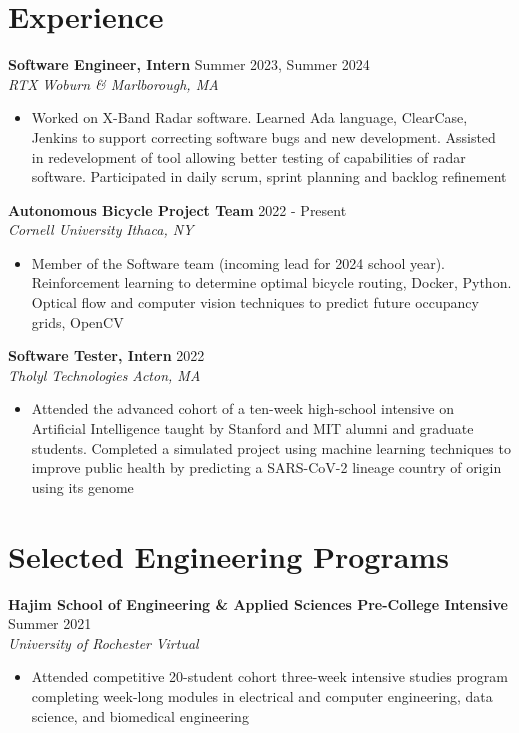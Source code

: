 \documentclass[letterpaper,8pt]{article}
\newcommand{\resumeEntry}[4]{
    \vspace{4pt}
    \large \textbf{#1}
    \normalsize \hfill #2
    \\
    \textit{#3} \hfill \textit{#4}
    \vspace{1pt}
}
\newcommand{\itemsBegin}{
    \begin{itemize}[leftmargin=0.2in, labelsep=0.05in, itemsep=0pt, parsep=1pt, topsep=0pt, partopsep=0pt]
}
\newcommand{\itemsEnd}{\end{itemize}}
\begin{document}
\section{Experience}

    \resumeEntry
        {Software Engineer, Intern}
        {Summer 2023, Summer 2024}
        {RTX}
        {Woburn \& Marlborough, MA}

    \itemsBegin
        \item Worked on X-Band Radar software. Learned Ada language, ClearCase, Jenkins to support correcting software bugs and new development. Assisted in redevelopment of tool allowing better testing of capabilities of radar software. Participated in daily scrum, sprint planning and backlog refinement
    \itemsEnd

    \resumeEntry
        {Autonomous Bicycle Project Team}
        {2022 - Present}
        {Cornell University}
        {Ithaca, NY}

    \itemsBegin
        \item Member of the Software team (incoming lead for 2024 school year). Reinforcement learning to determine optimal bicycle routing, Docker, Python. Optical flow and computer vision techniques to predict future occupancy grids, OpenCV
    \itemsEnd

    \resumeEntry
        {Software Tester, Intern}
        {2022}
        {Tholyl Technologies}
        {Acton, MA}

    \itemsBegin
        \item Attended the advanced cohort of a ten-week high-school intensive on Artificial Intelligence taught by Stanford and MIT alumni and graduate students. Completed a simulated project using machine learning techniques to improve public health by predicting a SARS-CoV-2 lineage country of origin using its genome
    \itemsEnd

\section{Selected Engineering Programs}


    \resumeEntry
        {Hajim School of Engineering \& Applied Sciences Pre-College Intensive}
        {Summer 2021}
        {University of Rochester}
        {Virtual}

    \itemsBegin
        \item Attended competitive 20-student cohort three-week intensive studies program completing week-long modules in electrical and computer engineering, data science, and biomedical engineering
    \itemsEnd
\end{document}
